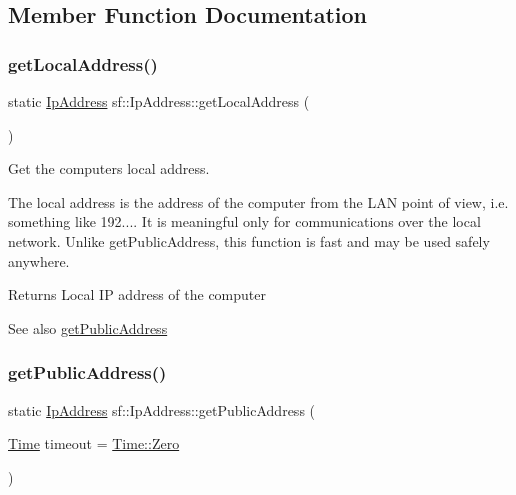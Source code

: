 \subsection{Member Function Documentation}
\mbox{\label{classsf_1_1_ip_address_a4c31622ad87edca48adbb8e8ed00ee4a}} 
\subsubsection{\texorpdfstring{getLocalAddress()}{getLocalAddress()}}
{\footnotesize\ttfamily static \mbox{\hyperlink{classsf_1_1_ip_address}{Ip\+Address}} sf\+::\+Ip\+Address\+::get\+Local\+Address (\begin{DoxyParamCaption}{ }\end{DoxyParamCaption})\hspace{0.3cm}{\ttfamily [static]}}



Get the computer\textquotesingle{}s local address. 

The local address is the address of the computer from the L\+AN point of view, i.\+e. something like 192.... It is meaningful only for communications over the local network. Unlike get\+Public\+Address, this function is fast and may be used safely anywhere.

\begin{DoxyReturn}{Returns}
Local IP address of the computer
\end{DoxyReturn}
\begin{DoxySeeAlso}{See also}
\mbox{\hyperlink{classsf_1_1_ip_address_a5c5cbf67e4aacf23c24f2ad991df4c55}{get\+Public\+Address}} \begin{DoxyVerb}\end{DoxyVerb}
 
\end{DoxySeeAlso}
\mbox{\label{classsf_1_1_ip_address_a5c5cbf67e4aacf23c24f2ad991df4c55}} 
\subsubsection{\texorpdfstring{getPublicAddress()}{getPublicAddress()}}
{\footnotesize\ttfamily static \mbox{\hyperlink{classsf_1_1_ip_address}{Ip\+Address}} sf\+::\+Ip\+Address\+::get\+Public\+Address (\begin{DoxyParamCaption}\item[{\mbox{\hyperlink{classsf_1_1_time}{Time}}}]{timeout = {\ttfamily \mbox{\hyperlink{classsf_1_1_time_a8db127b632fa8da21550e7282af11fa0}{Time\+::\+Zero}}} }\end{DoxyParamCaption})\hspace{0.3cm}{\ttfamily [static]}}



